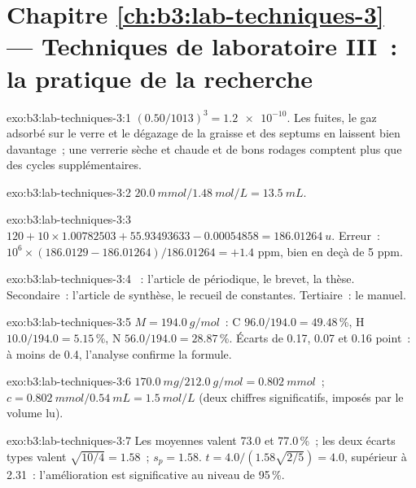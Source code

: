 \section*{Chapitre \ref{ch:b3:lab-techniques-3} --- Techniques de laboratoire III~: la pratique de la recherche}

\begin{solution}{exo:b3:lab-techniques-3:1}
$(0.50/1013)^3 = \num{1.2e-10}$. Les fuites, le gaz adsorbé sur le verre et le dégazage de la graisse et des septums
en laissent bien davantage~; une verrerie sèche et chaude et de bons rodages
comptent plus que des cycles supplémentaires.
\end{solution}

\begin{solution}{exo:b3:lab-techniques-3:2}
$\qty{20.0}{mmol}/\qty{1.48}{mol/L} = \qty{13.5}{mL}$.
\end{solution}

\begin{solution}{exo:b3:lab-techniques-3:3}
$120 + 10 \times 1.00782503 + 55.93493633 - 0.00054858 = \qty{186.01264}{u}$. Erreur~: $10^6 \times (186.0129 - 186.01264)/186.01264 = +1.4$ ppm,
bien en deçà de 5 ppm.
\end{solution}

\begin{solution}{exo:b3:lab-techniques-3:4}
~: l'article de périodique, le brevet, la thèse.
Secondaire~: l'article de synthèse, le recueil de constantes. Tertiaire~:
le manuel.
\end{solution}

\begin{solution}{exo:b3:lab-techniques-3:5}
$M = \qty{194.0}{g/mol}$~: C $96.0/194.0 = 49.48$\,\%, H $10.0/194.0 = 5.15$\,\%, N $56.0/194.0 = 28.87$\,\%. Écarts de 0.17, 0.07 et 0.16
point~: à moins de 0.4, l'analyse confirme la formule.
\end{solution}

\begin{solution}{exo:b3:lab-techniques-3:6}
$\qty{170.0}{mg}/\qty{212.0}{g/mol} = \qty{0.802}{mmol}$~; $c = \qty{0.802}{mmol}/\qty{0.54}{mL} = \qty{1.5}{mol/L}$ (deux chiffres significatifs, imposés par
le volume lu).
\end{solution}

\begin{solution}{exo:b3:lab-techniques-3:7}
Les moyennes valent 73.0 et 77.0\,\%~; les deux écarts types valent $\sqrt{10/4} = 1.58$~; $s_p = 1.58$. $t = 4.0/(1.58\sqrt{2/5}) = 4.0$, supérieur à
2.31~: l'amélioration est significative au niveau de 95\,\%.
\end{solution}

